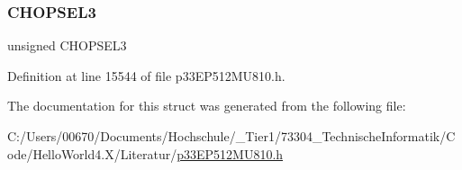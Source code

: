 \subsubsection{\texorpdfstring{C\+H\+O\+P\+S\+E\+L3}{CHOPSEL3}}
{\footnotesize\ttfamily unsigned C\+H\+O\+P\+S\+E\+L3}



Definition at line 15544 of file p33\+E\+P512\+M\+U810.\+h.



The documentation for this struct was generated from the following file\+:\begin{DoxyCompactItemize}
\item 
C\+:/\+Users/00670/\+Documents/\+Hochschule/\+\_\+\+Tier1/73304\+\_\+\+Technische\+Informatik/\+Code/\+Hello\+World4.\+X/\+Literatur/\hyperlink{p33_e_p512_m_u810_8h}{p33\+E\+P512\+M\+U810.\+h}\end{DoxyCompactItemize}
